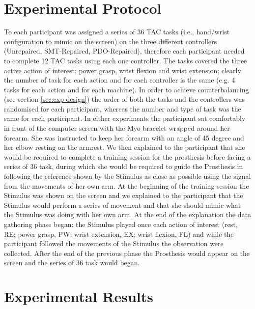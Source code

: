 \section{Experimental Protocol}\label{sec:exp-protocol}
To each participant was assigned a series of 36 TAC tasks (i.e., hand/wrist configuration to mimic on the screen) on the three different controllers (Unrepaired, SMT-Repaired, PDO-Repaired), therefore each participant needed to complete 12 TAC tasks using each one controller. The tasks covered the three active action of interest: power grasp, wrist flexion and wrist extension; clearly the number of task for each action and for each controller is the same (e.g. 4 tasks for each action and for each machine).
In order to achieve counterbalancing (see section \ref{sec:exp-design}) the order of both the tasks and the controllers was randomised for each participant, whereas the number and type of task was the same for each participant.
In either experiments the participant sat comfortably in front of the computer screen with the Myo bracelet wrapped around her forearm. She was instructed to keep her forearm with an angle of 45 degree and her elbow resting on the armrest.
We then explained to the participant that she would be required to complete a training session for the prosthesis before facing a series of 36 task, during which she would be required to guide the Prosthesis in following the reference shown by the Stimulus as close as possible using the signal from the movements of her own arm.
At the beginning of the training session the Stimulus was shown on the screen and we explained to the participant that the Stimulus would perform a series of movement and that she should mimic what the Stimulus was doing with her own arm. At the end of the explanation the data gathering phase began: the Stimulus played once each action of interest (rest, RE; power grasp, PW; wrist extension, EX; wrist flexion, FL) and while the participant followed the movements of the Stimulus the observation were collected. After the end of the previous phase the Prosthesis would appear on the screen and the series of 36 task would began.
%
%
%
%
%
\section{Experimental Results}\label{sec:exp-results}
